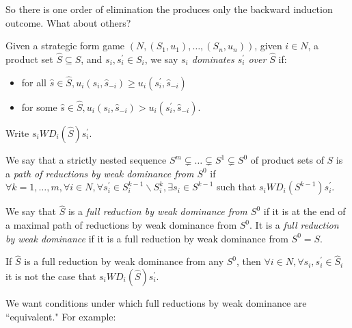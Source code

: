 \documentclass[12pt]{article}
\newcommand{\n}{\noindent}
\newcommand{\s}{\vspace{5mm}}
\begin{document}
\s
\n So there is one order of elimination the produces only the backward induction outcome.  What about others?

\s
\n Given a strategic form game $\left(N,(S_1,u_1),\hdots,(S_n,u_n)\right)$, given $i\in N$, a product set $\widehat{S}\subseteq S$, and $s_i,s_i^{\prime}\in S_i$, we say \textit{$s_i$ dominates $s_i^{\prime}$ over $\widehat{S}$} if:
\begin{itemize}
\item for all $\widehat{s}\in\widehat{S}, u_i(s_i,\widehat{s}_{-i})\geq u_i(s_i^{\prime},\widehat{s}_{-i})$
\item for some $\widehat{s}\in\widehat{S}, u_i(s_i,\widehat{s}_{-i})> u_i(s_i^{\prime},\widehat{s}_{-i})$.
\end{itemize}  Write $s_i WD_i(\widehat{S})s_i^{\prime}$.

\s
\n  We say that a strictly nested sequence $S^m\subsetneq\hdots\subsetneq S^1\subsetneq S^0$ of product sets of $S$ is a \textit{path of reductions by weak dominance from $S^0$} if $\forall k=1,\hdots,m, \forall i\in N, \forall s_i^{\prime}\in S_i^{k-1}\backslash S_i^k,\exists s_i\in S^{k-1}$ such that $s_iWD_i(S^{k-1})s_i^{\prime}$.

\s
\n We say that $\widehat{S}$ is a \textit{full reduction by weak dominance from $S^0$} if it is at the end of a maximal path of reductions by weak dominance from $S^0$.  It is a \textit{full reduction by weak dominance} if it is a full reduction by weak dominance from $S^0=S$.

\s
\n If $\widehat{S}$ is a full reduction by weak dominance from any $S^0$, then $\forall i\in N,\forall s_i,s_i^{\prime}\in \widehat{S}_i$ it is not the case that $s_iWD_i(\widehat{S})s_i^{\prime}$.

\s
\n We want conditions under which full reductions by weak dominance are ``equivalent."  For example:
\end{document}
